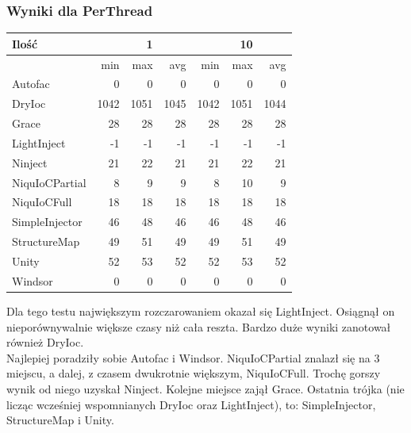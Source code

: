\documentclass[12pt]{article}
\begin{document}
\subsubsection{Wyniki dla PerThread}
\begin{center}
\begin{small}
	\begin{tabular}{ | l | r r r | r r r | }
    		\hline
Ilość & & 1 & & & 10 & \\ \hline
 & min & max & avg & min & max & avg \\ \hline
Autofac & 0 & 0 & 0 & 0 & 0 & 0 \\ \hline
DryIoc & 1042 & 1051 & 1045 & 1042 & 1051 & 1044 \\ \hline
Grace & 28 & 28 & 28 & 28 & 28 & 28 \\ \hline
LightInject & -1 & -1 & -1 & -1 & -1 & -1 \\ \hline
Ninject & 21 & 22 & 21 & 21 & 22 & 21 \\ \hline
NiquIoCPartial & 8 & 9 & 9 & 8 & 10 & 9 \\ \hline
NiquIoCFull & 18 & 18 & 18 & 18 & 18 & 18 \\ \hline
SimpleInjector & 46 & 48 & 46 & 46 & 48 & 46 \\ \hline
StructureMap & 49 & 51 & 49 & 49 & 51 & 49 \\ \hline
Unity & 52 & 53 & 52 & 52 & 53 & 52 \\ \hline
Windsor & 0 & 0 & 0 & 0 & 0 & 0 \\ \hline
  	\end{tabular}
\end{small}
\end{center}
Dla tego testu największym rozczarowaniem okazał się LightInject. Osiągnął on nieporównywalnie większe czasy niż cała reszta. Bardzo duże wyniki zanotował również DryIoc.\\
Najlepiej poradziły sobie Autofac i Windsor. NiquIoCPartial znalazł się na 3 miejscu, a dalej, z czasem dwukrotnie większym, NiquIoCFull. Trochę gorszy wynik od niego uzyskał Ninject. Kolejne miejsce zajął Grace. Ostatnia trójka (nie licząc wcześniej wspomnianych DryIoc oraz LightInject), to: SimpleInjector, StructureMap i Unity.
\end{document}
